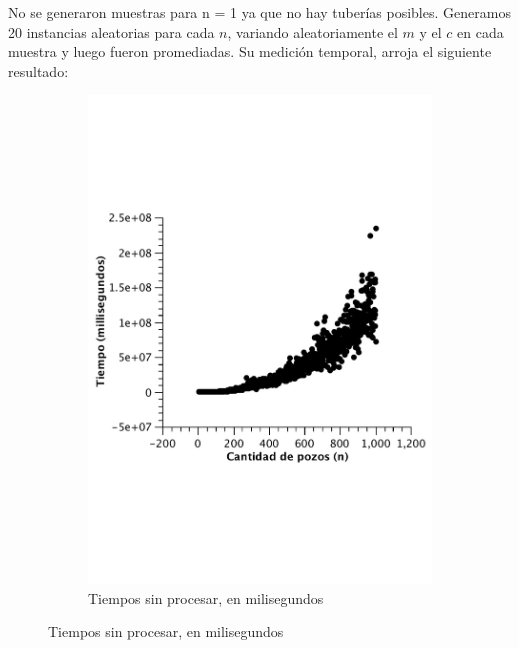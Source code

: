 No se generaron muestras para n = 1 ya que no hay tuberías posibles.
Generamos 20 instancias aleatorias para cada $n$, variando aleatoriamente el $m$ y el $c$ en cada muestra y luego fueron promediadas. Su medición temporal, arroja el siguiente resultado:


\begin{figure}[H]
        \centering
\begin{subfigure}[b]{0.5\textwidth}
                \includegraphics[width=\textwidth]{imagenes/ej3-rawData.pdf}
                \caption*{Tiempos sin procesar, en milisegundos}
        \end{subfigure}%


\end{figure}
